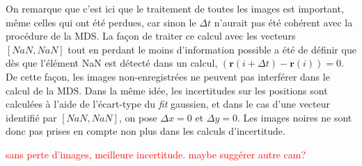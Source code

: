 \documentclass[11pt,letterpaper]{article}
\begin{document}
On remarque que c'est ici que le traitement de toutes les images est important, même celles qui ont été perdues, car sinon le $\Delta t$ n'aurait pas été cohérent avec la procédure de la MDS. 
La façon de traiter ce calcul avec les vecteurs $\left [ NaN ,NaN \right ]$ tout en perdant le moins d'information possible a été de définir que 
dès que l’élément NaN est détecté dans un calcul, $\left( \mathbf{r}(i+\Delta t) - \mathbf{r}(i) \right)=0$. De cette façon, les images non-enregistrées
ne peuvent pas interférer dans le calcul de la MDS. Dans la même idée, les incertitudes sur les positions sont calculées à l'aide de l'écart-type 
du \textit{fit} gaussien, et dans le cas d'une vecteur identifié par $[NaN, NaN]$, on pose $\Delta x=0$ et $\Delta y=0$. Les images noires ne sont donc pas prises en compte non plus dans les calculs d'incertitude. 

\textcolor{red}{sans perte d'images, meilleure incertitude. maybe suggérer autre cam?}
\end{document}

